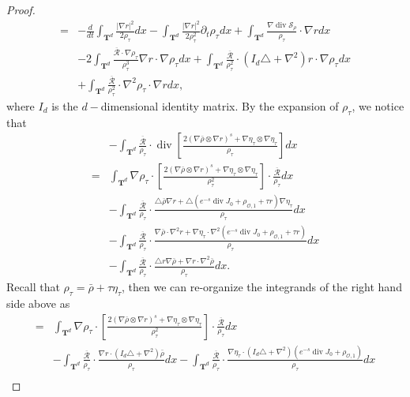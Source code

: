\documentclass[10pt,a4paper]{amsart}
\def\T{{\mathbf T}}%
\def\d{{\partial}}
\DeclareMathOperator{\diver}{div}
\begin{document}
\begin{proof}
\begin{align*}
=&-\frac{d}{dt}\int_{\T^d}\frac{|\nabla r|^2}{2\rho_\tau}dx-\int_{\T^d}\frac{|\nabla r|^2}{2\rho_\tau^2}\d_t\rho_\tau dx+\int_{\T^d} \frac{\nabla\diver \mathcal{S}_\rho}{\rho_\tau}\cdot\nabla rdx\\
&-2\int_{\T^d} \frac{\overline{\mathcal{R}}\cdot\nabla\rho_\tau}{\rho_\tau^3}\nabla r\cdot\nabla\rho_\tau dx+\int_{\T^d} \frac{\overline{\mathcal{R}}}{\rho_\tau^2}\cdot(I_d\triangle+\nabla^2)r\cdot\nabla\rho_\tau dx\\
&+\int_{\T^d} \frac{\overline{\mathcal{R}}}{\rho_\tau^2}\cdot\nabla^2\rho_\tau\cdot\nabla r dx,
\end{align*}
where $I_d$ is the $d-$dimensional identity matrix. By the expansion of $\rho_\tau$, we notice that
\begin{align*}
&-\int_{\T^d} \frac{\overline{\mathcal{R}}}{\rho_\tau}\cdot\diver\left[\frac{2(\nabla\bar\rho\otimes \nabla r)^s+\nabla \eta_\tau\otimes \nabla \eta_\tau}{\rho_\tau}\right]dx\\
=&\int_{\T^d} \nabla\rho_\tau\cdot\left[\frac{2(\nabla\bar\rho\otimes \nabla r)^s+\nabla \eta_\tau\otimes \nabla \eta_\tau}{\rho_\tau^2}\right]\cdot\frac{\overline{\mathcal{R}}}{\rho_\tau} dx\\
&-\int_{\T^d} \frac{\overline{\mathcal{R}}}{\rho_\tau}\cdot\frac{\triangle\bar\rho\nabla r+\triangle (e^{-s}\diver J_0+\rho_{\mathcal{O},1}+\tau r)\nabla\eta_\tau}{\rho_\tau}dx\\
&-\int_{\T^d} \frac{\overline{\mathcal{R}}}{\rho_\tau}\cdot\frac{\nabla\bar\rho\cdot\nabla^2 r+\nabla\eta_\tau\cdot\nabla^2(e^{-s}\diver J_0+\rho_{\mathcal{O},1}+\tau r)}{\rho_\tau}dx\\
&-\int_{\T^d} \frac{\overline{\mathcal{R}}}{\rho_\tau}\cdot\frac{\triangle r\nabla\bar\rho+\nabla r\cdot\nabla^2\bar\rho}{\rho_\tau}dx.
\end{align*}
Recall that $\rho_\tau=\bar\rho+\tau\eta_\tau$, then we can re-organize the integrands of the right hand side above as
\begin{align*}
=&\int_{\T^d} \nabla\rho_\tau\cdot\left[\frac{2(\nabla\bar\rho\otimes \nabla r)^s+\nabla \eta_\tau\otimes \nabla \eta_\tau}{\rho_\tau^2}\right]\cdot\frac{\overline{\mathcal{R}}}{\rho_\tau} dx\\
&-\int_{\T^d} \frac{\overline{\mathcal{R}}}{\rho_\tau}\cdot\frac{\nabla r\cdot(I_d\triangle+\nabla^2 )\bar\rho}{\rho_\tau}dx-\int_{\T^d} \frac{\overline{\mathcal{R}}}{\rho_\tau}\cdot\frac{\nabla \eta_\tau\cdot(I_d\triangle+\nabla^2)(e^{-s}\diver J_0+\rho_{\mathcal{O},1})}{\rho_\tau}dx\\

\end{align*}
\end{proof}
\end{document}

